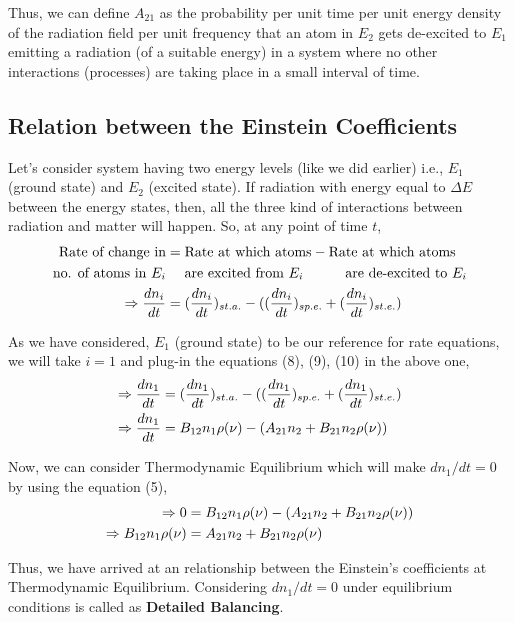 \documentclass[12pt]{article}
\begin{document}
Thus, we can define $A_{21}$ as the probability per unit time per unit energy density of the radiation field per unit frequency that an atom in $E_{2}$ gets de-excited to $E_{1}$ emitting a radiation (of a suitable energy) in a system where no other interactions (processes) are taking place in a small interval of time.

\subsection{Relation between the Einstein Coefficients}

Let's consider system having two energy levels (like we did earlier) i.e., $E_{1}$ (ground state) and $E_{2}$ (excited state). If radiation with energy equal to $\Delta E$ between the energy states, then, all the three kind of interactions between radiation and matter will happen. So, at any point of time $t$,
\begin{align}
    \text{Rate of change in} & = \text{Rate at which atoms} - \text{Rate at which atoms} \notag \\
    \text{no. of atoms in } E_{i} & \quad \text{ are excited from } E_{i} \quad \qquad \text{are de-excited to } E_{i} \notag \\
    \Rightarrow \frac{dn_{i}}{dt} & = (\frac{dn_{i}}{dt})_{st.a.} - ((\frac{dn_{i}}{dt})_{sp.e.} + (\frac{dn_{i}}{dt})_{st.e.}) \notag
\end{align}

As we have considered, $E_{1}$ (ground state) to be our reference for rate equations, we will take $i = 1$ and plug-in the equations (8), (9), (10) in the above one,
\begin{align}
    \Rightarrow \frac{dn_{1}}{dt} & = (\frac{dn_{1}}{dt})_{st.a.} - ((\frac{dn_{1}}{dt})_{sp.e.} + (\frac{dn_{1}}{dt})_{st.e.}) \notag \\
    \Rightarrow \frac{dn_{1}}{dt} & = B_{12}n_{1}\rho(\nu) - (A_{21}n_{2} + B_{21}n_{2}\rho(\nu))
\end{align}

Now, we can consider Thermodynamic Equilibrium which will make $dn_{1}/dt = 0$ by using the equation (5), 
\begin{align}
    \Rightarrow 0 & = B_{12}n_{1}\rho(\nu) - (A_{21}n_{2} + B_{21}n_{2}\rho(\nu)) \notag \\
    \Rightarrow B_{12}n_{1}\rho(\nu) & = A_{21}n_{2} + B_{21}n_{2}\rho(\nu)
\end{align}

Thus, we have arrived at an relationship between the Einstein's coefficients at Thermodynamic Equilibrium. Considering $dn_{1}/dt = 0$ under equilibrium conditions is called as \textbf{Detailed Balancing}. \vspace{.2cm}
\end{document}
